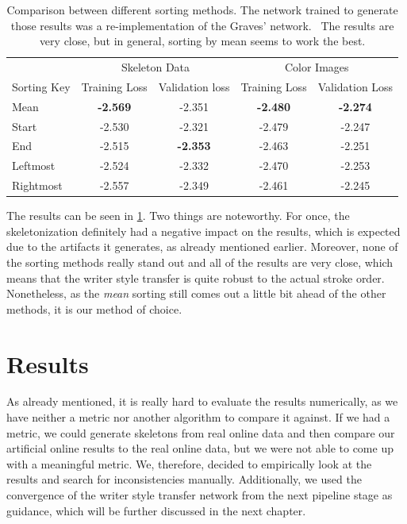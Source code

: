 \begin{table}
  \centering
  \begin{tabular}{lcccc}
  \toprule
  &\multicolumn{2}{c}{Skeleton Data}&\multicolumn{2}{c}{Color Images}\\ \cmidrule(l){2-3} \cmidrule(l){4-5}
  Sorting Key & Training Loss & Validation loss & Training Loss & Validation Loss\\
  \midrule
  Mean        & \textbf{-2.569} & -2.351 & \textbf{-2.480} & \textbf{-2.274} \\
  Start       & -2.530 & -2.321 & -2.479 & -2.247 \\
  End         & -2.515 & \textbf{-2.353} & -2.463 & -2.251 \\ 
  Leftmost    & -2.524 & -2.332 & -2.470 & -2.253 \\
  Rightmost   & -2.557 & -2.349 & -2.461 & -2.245 \\
  \bottomrule
  \end{tabular}
  \caption[Comparison between different sorting methods]{Comparison between different sorting methods. The network trained to generate those results was a re-implementation of the Graves' network.~\cite{gravesImplementationOurs} The results are very close, but in general, sorting by mean seems to work the best.}
  \label{table:sortingComparison}
\end{table}

The results can be seen in \cref{table:sortingComparison}. Two things are noteworthy. For once, the skeletonization definitely had a negative impact on the results, which is expected due to the artifacts it generates, as already mentioned earlier. Moreover, none of the sorting methods really stand out and all of the results are very close, which means that the writer style transfer is quite robust to the actual stroke order. Nonetheless, as the \emph{mean} sorting still comes out a little bit ahead of the other methods, it is our method of choice.



\section{Results}

As already mentioned, it is really hard to evaluate the results numerically, as we have neither a metric nor another algorithm to compare it against. If we had a metric, we could generate skeletons from real online data and then compare our artificial online results to the real online data, but we were not able to come up with a meaningful metric. We, therefore, decided to empirically look at the results and search for inconsistencies manually. Additionally, we used the convergence of the writer style transfer network from the next pipeline stage as guidance, which will be further discussed in the next chapter.


